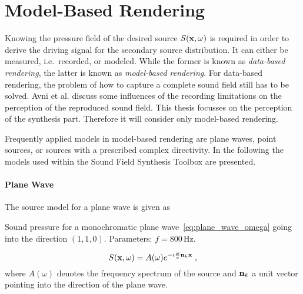 \newpage

\section{Model-Based Rendering}
\label{sec:model_based_rendering}
%
Knowing the pressure field of the desired source $S(\mathbf{x},\omega)$ is required
in order to derive the driving signal for the secondary source distribution.
It can either be measured, i.e.~recorded, or modeled. While the former is known as
{\em data-based rendering},
the latter is known as {\em model-based rendering}.
For data-based rendering, the problem of how to capture a complete sound field
still has to be solved. Avni et al. discuss some influences of the
recording limitations on the perception of the reproduced sound field.\autocite{Avni2013}
This thesis focusses on the perception of the synthesis part. Therefore it
will consider only model-based rendering.

Frequently applied models in model-based rendering are plane waves, point
sources, or sources with a prescribed complex directivity.
In the following the models used within the Sound Field Synthesis
Toolbox are presented.
%
\paragraph{Plane Wave}
\label{sec:plane_wave}
%
The source model for a plane wave is given
as
%
\begin{marginfigure}
    \centering
    \ft
    
    \caption{Sound pressure for a monochromatic plane
        wave~\eqref{eq:plane_wave_omega} going into the
        direction $(1,1,0)$. Parameters: $f = 800$\,Hz.
        }
\end{marginfigure}
%
\begin{equation} 
    S(\x,\omega) = A(\omega) e^{-i\omegac \n_k \x}
    \qc
    \label{eq:plane_wave_omega}
\end{equation}
%
where $A(\omega)$ denotes the frequency spectrum of the source
and $\mathbf{n}_k$ a unit vector pointing into the direction of
the plane wave.

